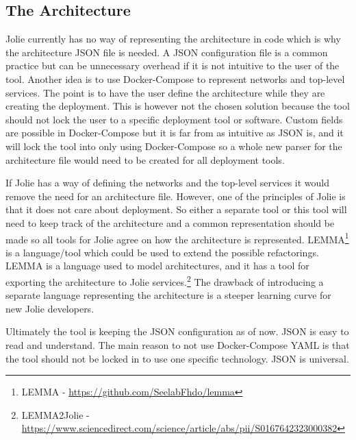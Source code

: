 \subsection{The Architecture}
Jolie currently has no way of representing the architecture in code which is why the architecture JSON file is needed.
A JSON configuration file is a common practice but can be unnecessary overhead if it is not intuitive to the user of the tool.
Another idea is to use Docker-Compose to represent networks and top-level services. The point is to have the user define the architecture while they are creating the deployment.
This is however not the chosen solution because the tool should not lock the user to a specific deployment tool or software.
Custom fields are possible in Docker-Compose but it is far from as intuitive as JSON is, and it will lock the tool into only using Docker-Compose so a whole new 
parser for the architecture file would need to be created for all deployment tools.

If Jolie has a way of defining the networks and the top-level services it would remove the need for an architecture file.
However, one of the principles of Jolie is that it does not care about deployment.
So either a separate tool or this tool will need to keep track of the architecture and a common representation should be made so all tools for Jolie agree on how the architecture is represented.
LEMMA\footnote{LEMMA - \url{https://github.com/SeelabFhdo/lemma}} is a language/tool which could be used to extend the possible refactorings. LEMMA is a language used to model architectures, and it has a tool for exporting the architecture to Jolie services.\footnote{LEMMA2Jolie - \url{https://www.sciencedirect.com/science/article/abs/pii/S0167642323000382}} The drawback
of introducing a separate language representing the architecture is a steeper learning curve for new Jolie developers.

Ultimately the tool is keeping the JSON configuration as of now. JSON is easy to read and understand. The main reason to not use Docker-Compose YAML is that the tool should not be locked in to use one specific technology. JSON is universal.

